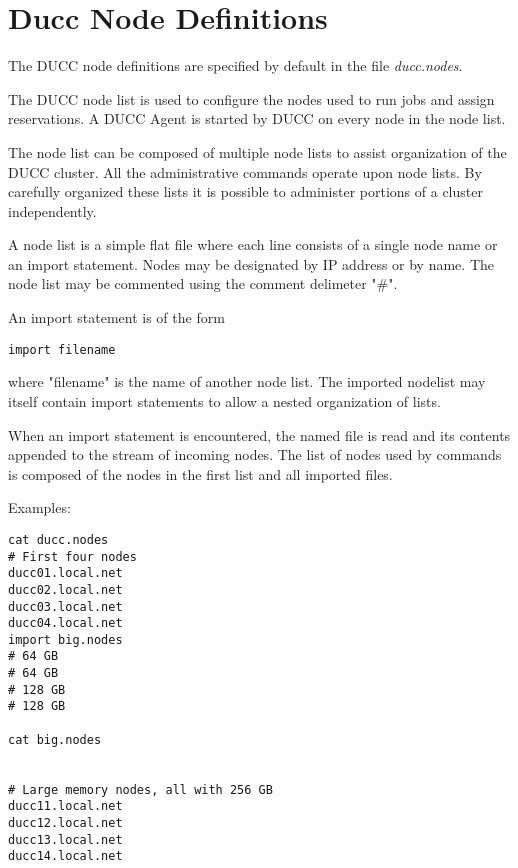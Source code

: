 \section{Ducc Node Definitions}
\label{sec:admin-ducc.nodes}
    The DUCC node definitions are specified by default in the file {\em ducc.nodes}.

    The DUCC node list is used to configure the nodes used to run jobs and assign reservations. A 
    DUCC Agent is started by DUCC on every node in the node list. 

    The node list can be composed of multiple node lists to assist organization of the DUCC cluster. 
    All the administrative commands operate upon node lists. By carefully organized these lists it is 
    possible to administer portions of a cluster independently. 
    
    A node list is a simple flat file where each line consists of a single node name or an import 
    statement. Nodes may be designated by IP address or by name. The node list may be commented 
    using the comment delimeter "\#". 
    
    An import statement is of the form 

\begin{verbatim}
import filename 
\end{verbatim}
    
    where "filename" is the name of another node list. The imported nodelist may itself contain import 
    statements to allow a nested organization of lists. 

    When an import statement is encountered, the named file is read and its contents appended to the 
    stream of incoming nodes. The list of nodes used by commands is composed of the nodes in the 
    first list and all imported files. 

    Examples: 

\begin{verbatim}
cat ducc.nodes 
# First four nodes 
ducc01.local.net 
ducc02.local.net 
ducc03.local.net 
ducc04.local.net 
import big.nodes 
# 64 GB 
# 64 GB 
# 128 GB 
# 128 GB 

cat big.nodes 


# Large memory nodes, all with 256 GB 
ducc11.local.net 
ducc12.local.net 
ducc13.local.net 
ducc14.local.net 
\end{verbatim}
    
